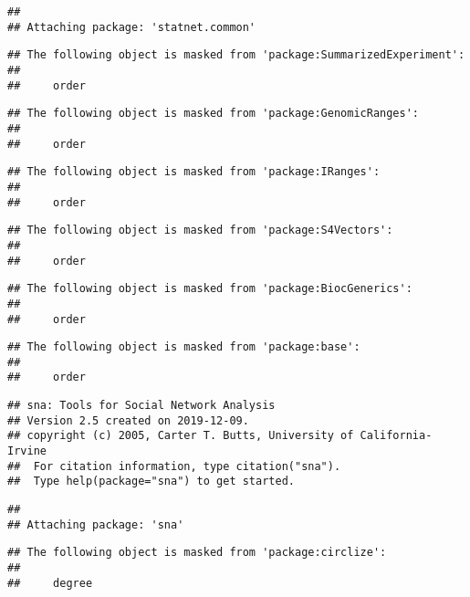 \documentclass[]{article}
\begin{document}
\begin{verbatim}
## 
## Attaching package: 'statnet.common'
\end{verbatim}

\begin{verbatim}
## The following object is masked from 'package:SummarizedExperiment':
## 
##     order
\end{verbatim}

\begin{verbatim}
## The following object is masked from 'package:GenomicRanges':
## 
##     order
\end{verbatim}

\begin{verbatim}
## The following object is masked from 'package:IRanges':
## 
##     order
\end{verbatim}

\begin{verbatim}
## The following object is masked from 'package:S4Vectors':
## 
##     order
\end{verbatim}

\begin{verbatim}
## The following object is masked from 'package:BiocGenerics':
## 
##     order
\end{verbatim}

\begin{verbatim}
## The following object is masked from 'package:base':
## 
##     order
\end{verbatim}

\begin{verbatim}
## sna: Tools for Social Network Analysis
## Version 2.5 created on 2019-12-09.
## copyright (c) 2005, Carter T. Butts, University of California-Irvine
##  For citation information, type citation("sna").
##  Type help(package="sna") to get started.
\end{verbatim}

\begin{verbatim}
## 
## Attaching package: 'sna'
\end{verbatim}

\begin{verbatim}
## The following object is masked from 'package:circlize':
## 
##     degree
\end{verbatim}
\end{document}
